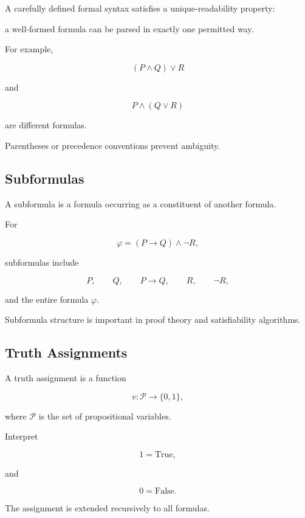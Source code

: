 A carefully defined formal syntax satisfies a unique-readability property:

a well-formed formula can be parsed in exactly one permitted way.

For example,

\[
(P\land Q)\lor R
\]

and

\[
P\land(Q\lor R)
\]

are different formulas.

Parentheses or precedence conventions prevent ambiguity.

\subsection{Subformulas}
\label{subsec:subformulas}

A subformula is a formula occurring as a constituent of another formula.

For

\[
\varphi
=
(P\rightarrow Q)\land\neg R,
\]

subformulas include

\[
P,
\qquad
Q,
\qquad
P\rightarrow Q,
\qquad
R,
\qquad
\neg R,
\]

and the entire formula \(\varphi\).

Subformula structure is important in proof theory and satisfiability
algorithms.

\subsection{Truth Assignments}
\label{subsec:truth-assignments}

A truth assignment is a function

\[
\boxed{
v:
\mathcal{P}
\rightarrow
\{0,1\},
}
\]

where \(\mathcal{P}\) is the set of propositional variables.

Interpret

\[
1
=
\text{True},
\]

and

\[
0
=
\text{False}.
\]

The assignment is extended recursively to all formulas.

